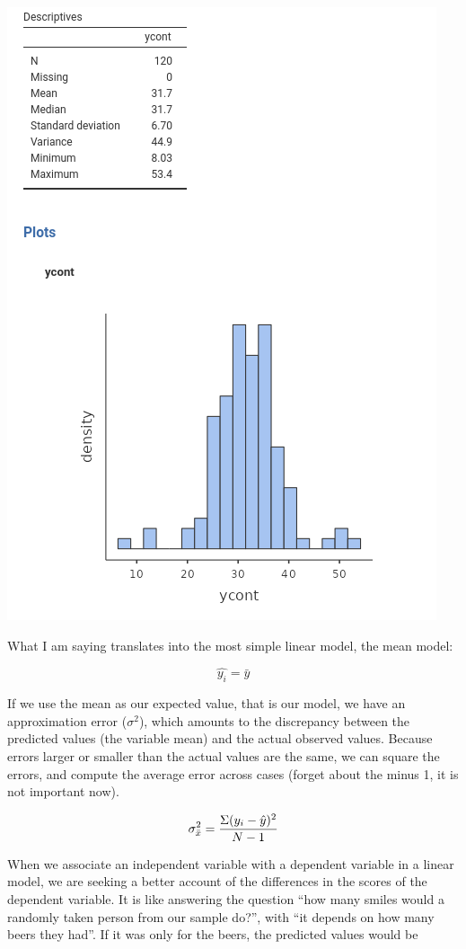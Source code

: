 \documentclass[
]{book}
\begin{document}
\includegraphics{bookletpics/ap_a_output1.png}

What I am saying translates into the most simple linear model, the mean model:

\[ \hat{y_i}=\bar{y}\]

If we use the mean as our expected value, that is our model, we have an approximation error (\(\sigma^2\)), which amounts to the discrepancy between the predicted values (the variable mean) and the actual observed values. Because errors larger or smaller than the actual values are the same, we can square the errors, and compute the average error across cases (forget about the minus 1, it is not important now).

\[ \sigma^2_{\bar{x}}={\Sigma{(y_i-\hat{y})^2} \over {N-1}}\]

When we associate an independent variable with a dependent variable in a linear model, we are seeking a better account of the differences in the scores of the dependent variable. It is like answering the question ``how many smiles would a randomly taken person from our sample do?'', with ``it depends on how many beers they had''. If it was only for the beers, the predicted values would be
\end{document}
